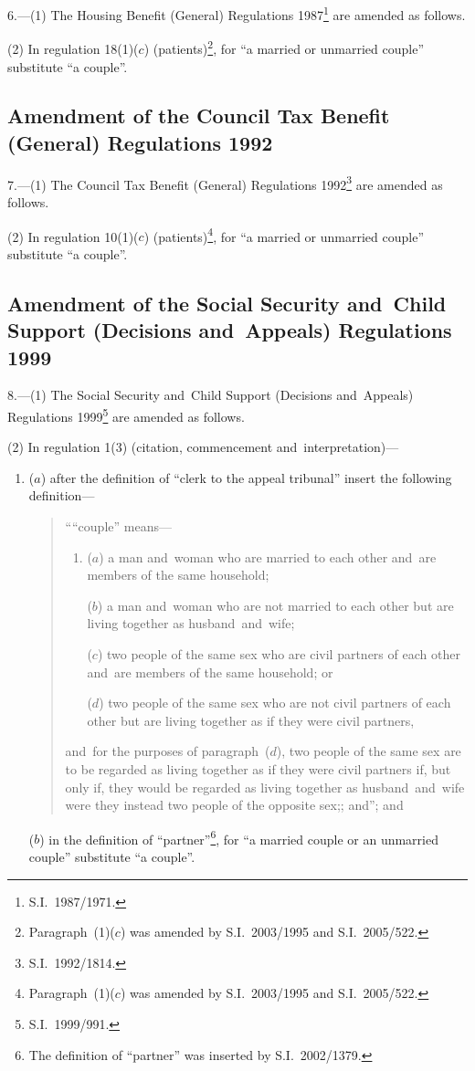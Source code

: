 \documentclass[12pt,a4paper]{article}
\begin{document}
6.---(1)  The Housing Benefit (General) Regulations 1987\footnote{S.I.~1987/1971.} are amended as follows.

(2) In regulation 18(1)($c$)  (patients)\footnote{Paragraph~(1)($c$) was amended by S.I.~2003/1995 and S.I.~2005/522.}, for “a married or unmarried couple” substitute “a couple”.

\subsection[7. Amendment of the Council Tax Benefit (General) Regulations 1992]{Amendment of the Council Tax Benefit (General) Regulations 1992}

7.---(1)  The Council Tax Benefit (General) Regulations 1992\footnote{S.I.~1992/1814.} are amended as follows.

(2) In regulation 10(1)($c$)  (patients)\footnote{Paragraph~(1)($c$) was amended by S.I.~2003/1995 and S.I.~2005/522.}, for “a married or unmarried couple” substitute “a couple”.

\subsection[8. Amendment of the Social Security and~Child Support (Decisions and~Appeals) Regulations 1999]{Amendment of the Social Security and~Child Support (Decisions and~Appeals) Regulations 1999}

8.---(1)  The Social Security and~Child Support (Decisions and~Appeals) Regulations 1999\footnote{S.I.~1999/991.} are amended as follows.

(2) In regulation 1(3) (citation, commencement and~interpretation)—
\begin{enumerate}\item[]
($a$) after the definition of “clerk to the appeal tribunal” insert the following definition—
\begin{quotation}
““couple” means—
\begin{enumerate}\item[]
($a$) 
a man and~woman who are married to each other and~are members of the same household;

($b$) 
a man and~woman who are not married to each other but are living together as husband~and~wife;

($c$) 
two people of the same sex who are civil partners of each other and~are members of the same household; or

($d$) 
two people of the same sex who are not civil partners of each other but are living together as if they were civil partners,
\end{enumerate}
and~for the purposes of paragraph~($d$), two people of the same sex are to be regarded as living together as if they were civil partners if, but only if, they would be regarded as living together as husband~and~wife were they instead two people of the opposite sex;; and”; and
\end{quotation}

($b$) in the definition of “partner”\footnote{The definition of “partner” was inserted by S.I.~2002/1379.}, for “a married couple or an unmarried couple” substitute “a couple”.
\end{enumerate}
\end{document}
